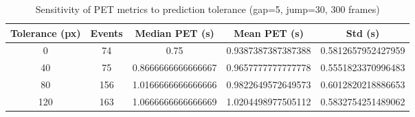 \begin{table}[h]
\centering
\caption{Sensitivity of PET metrics to prediction tolerance (gap=5, jump=30, 300 frames)}
\label{tab:sensitivity_pred_tol_300}
\begin{tabular}{ccccc}
\hline
\textbf{Tolerance (px)} & \textbf{Events} & \textbf{Median PET (s)} & \textbf{Mean PET (s)} & \textbf{Std (s)} \\
\hline
0 & 74 & 0.75 & 0.9387387387387388 & 0.5812657952427959 \\
40 & 75 & 0.8666666666666667 & 0.9657777777777778 & 0.5551823370996483 \\
80 & 156 & 1.0166666666666666 & 0.9822649572649573 & 0.6012820218886653 \\
120 & 163 & 1.0666666666666669 & 1.0204498977505112 & 0.5832754251489062 \\
\hline
\end{tabular}
\end{table}
